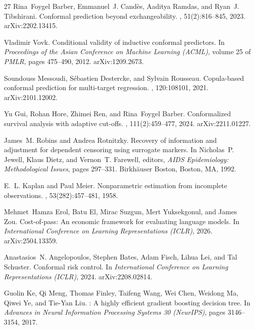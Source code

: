 \documentclass{article}
\begin{document}
\begin{thebibliography}{27}
Rina~Foygel Barber, Emmanuel~J. Cand{\`e}s, Aaditya Ramdas, and Ryan~J. Tibshirani.
\newblock Conformal prediction beyond exchangeability.
, 51(2):816--845, 2023. arXiv:2202.13415.

Vladimir Vovk.
\newblock Conditional validity of inductive conformal predictors.
\newblock In {\em Proceedings of the Asian Conference on Machine Learning (ACML)},
  volume 25 of {\em PMLR}, pages 475--490, 2012. arXiv:1209.2673.

Soundouss Messoudi, S{\'e}bastien Destercke, and Sylvain Rousseau.
\newblock Copula-based conformal prediction for multi-target regression.
, 120:108101, 2021. arXiv:2101.12002.

Yu Gui, Rohan Hore, Zhimei Ren, and Rina~Foygel Barber.
\newblock Conformalized survival analysis with adaptive cut-offs.
, 111(2):459--477, 2024. arXiv:2211.01227.

James~M. Robins and Andrea Rotnitzky.
\newblock Recovery of information and adjustment for dependent censoring using
  surrogate markers.
\newblock In Nicholas~P. Jewell, Klaus Dietz, and Vernon~T. Farewell, editors, {\em
  AIDS Epidemiology: Methodological Issues}, pages 297--331. Birkh{\"a}user Boston,
  Boston, MA, 1992.

E.~L. Kaplan and Paul Meier.
\newblock Nonparametric estimation from incomplete observations.
, 53(282):457--481,
  1958.

Mehmet~Hamza Erol, Batu El, Mirac Suzgun, Mert Yuksekgonul, and James Zou.
\newblock Cost-of-pass: An economic framework for evaluating language models.
\newblock In {\em International Conference on Learning Representations (ICLR)}, 2026.
  arXiv:2504.13359.

Anastasios~N. Angelopoulos, Stephen Bates, Adam Fisch, Lihua Lei, and Tal Schuster.
\newblock Conformal risk control.
\newblock In {\em International Conference on Learning Representations (ICLR)}, 2024.
  arXiv:2208.02814.

Guolin Ke, Qi Meng, Thomas Finley, Taifeng Wang, Wei Chen, Weidong Ma, Qiwei Ye, and
  Tie-Yan Liu.
: A highly efficient gradient boosting decision tree.
\newblock In {\em Advances in Neural Information Processing Systems 30 (NeurIPS)},
  pages 3146--3154, 2017.

\end{thebibliography}
\end{document}

